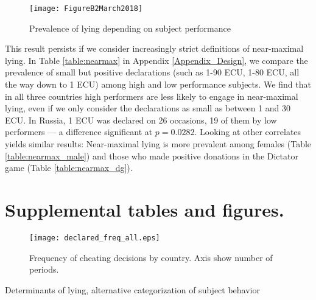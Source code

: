 \documentclass[12pt]{article}
\begin{document}
\begin{figure}[!htb]
\centerline{\texttt{[image: FigureB2March2018]}}
\caption{Prevalence of lying depending on subject performance}\label{fig:cheat_hilo}
\end{figure}

This result persists if we consider increasingly strict definitions of near-maximal lying. In Table \ref{table:nearmax} in Appendix \ref{Appendix_Design}, we compare the prevalence of small but positive declarations (such as 1-90 ECU, 1-80 ECU, all the way down to 1 ECU) among high and low performance subjects. We find that in all three countries high performers are less likely to engage in near-maximal lying, even if we only consider the declarations as small as between 1 and 30 ECU. In Russia, 1 ECU was declared on 26 occasions, 19 of them by low performers --- a difference significant at $p=0.0282$. Looking at other correlates yields similar results: Near-maximal lying is more prevalent among females (Table \ref{table:nearmax_male}) and those who made positive donations in the Dictator game (Table \ref{table:nearmax_dg}).  


\clearpage



\section{Supplemental tables and figures.}
\label{AppendixA}

\setcounter{table}{0}
\setcounter{figure}{0}

\begin{figure}[!htb]
\centerline{\texttt{[image: declared\_freq\_all.eps]}}
\caption{Frequency of cheating decisions by country. Axis show number of periods.}\label{fig:declared_freq_all}
\end{figure}

\begin{table}[ht]
\begin{center}
\tiny

\end{center}
\caption{Determinants of lying, alternative categorization of subject behavior}
\label{table1_1}
\end{table}
\end{document}
